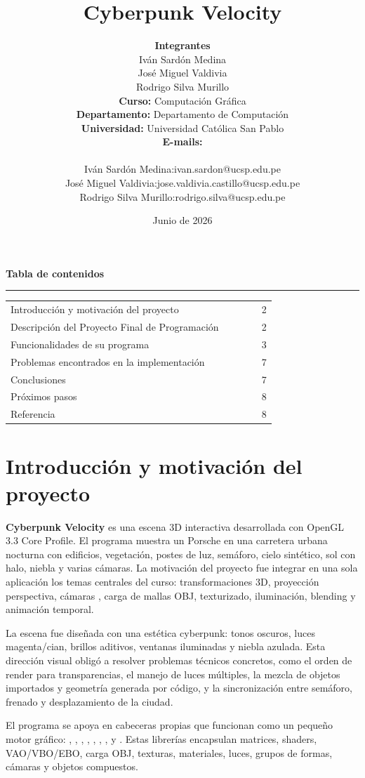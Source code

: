 \documentclass[11pt,a4paper]{article}
\title{\textbf{Cyberpunk Velocity}}
\author{
    \textbf{Integrantes}\\[0.25em]
    Iván Sardón Medina\\
    José Miguel Valdivia\\
    Rodrigo Silva Murillo\\[0.85em]
    \textbf{Curso:} Computación Gráfica\\
    \textbf{Departamento:} Departamento de Computación\\
    \textbf{Universidad:} Universidad Católica San Pablo\\[0.85em]
    \textbf{E-mails:}\\[0.25em]
    \begin{tabular}{@{}ll@{}}
    Iván Sardón Medina: & ivan.sardon@ucsp.edu.pe\\
    José Miguel Valdivia: & jose.valdivia.castillo@ucsp.edu.pe\\
    Rodrigo Silva Murillo: & rodrigo.silva@ucsp.edu.pe
    \end{tabular}
}
\date{Junio de 2026}
\newcommand{\code}[1]{\texttt{\detokenize{#1}}}
\begin{document}
\maketitle

\vfill
\begin{center}
\begin{minipage}{0.72\linewidth}
\footnotesize
\textbf{Tabla de contenidos}\\[-0.2em]
\hrule
\vspace{0.35em}
\begin{tabular}{@{}L{0.82\linewidth}r@{}}
Introducción y motivación del proyecto & 2\\
Descripción del Proyecto Final de Programación & 2\\
Funcionalidades de su programa & 3\\
Problemas encontrados en la implementación & 7\\
Conclusiones & 7\\
Próximos pasos & 8\\
Referencia & 8
\end{tabular}
\end{minipage}
\end{center}
\newpage

\section{Introducción y motivación del proyecto}

\textbf{Cyberpunk Velocity} es una escena 3D interactiva desarrollada con OpenGL 3.3 Core Profile. El programa muestra un Porsche en una carretera urbana nocturna con edificios, vegetación, postes de luz, semáforo, cielo sintético, sol con halo, niebla y varias cámaras. La motivación del proyecto fue integrar en una sola aplicación los temas centrales del curso: transformaciones 3D, proyección perspectiva, cámaras \code{lookAt}, carga de mallas OBJ, texturizado, iluminación, blending y animación temporal.

La escena fue diseñada con una estética cyberpunk: tonos oscuros, luces magenta/cian, brillos aditivos, ventanas iluminadas y niebla azulada. Esta dirección visual obligó a resolver problemas técnicos concretos, como el orden de render para transparencias, el manejo de luces múltiples, la mezcla de objetos importados y geometría generada por código, y la sincronización entre semáforo, frenado y desplazamiento de la ciudad.

El programa se apoya en cabeceras propias que funcionan como un pequeño motor gráfico: , , , , , , ,  y . Estas librerías encapsulan matrices, shaders, VAO/VBO/EBO, carga OBJ, texturas, materiales, luces, grupos de formas, cámaras y objetos compuestos.
\end{document}
